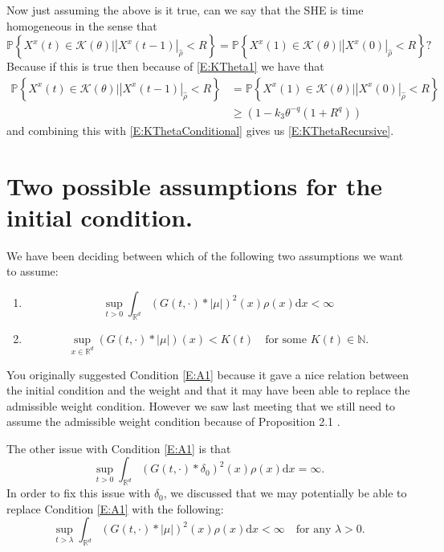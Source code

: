 \documentclass{article}
\numberwithin{equation}{section}
\newcommand{\R}{\mathbb{R}}
\newcommand{\ud}{\ensuremath{\mathrm{d}}}
\begin{document}
Now just assuming the above is it true, can we say that the SHE is time homogeneous in the sense that 
	\[
			\mathbb{P}\left\{ X^x(t) \in \mathscr{K}(\theta) \bigg\vert  \left| X^x(t-1) \right|_{\hat{\rho}} < R  \right\} = \mathbb{P}\left\{ X^x(1) \in \mathscr{K}(\theta) \bigg\vert  \left| X^x(0) \right|_{\hat{\rho}} < R  \right\}? 
	\]
Because if this is true then because of \eqref{E:KTheta1} we have that 
	\begin{align*}
			\mathbb{P}\left\{ X^x(t) \in \mathscr{K}(\theta) \bigg\vert  \left| X^x(t-1) \right|_{\hat{\rho}} < R  \right\} &= \mathbb{P}\left\{ X^x(1) \in \mathscr{K}(\theta) \bigg\vert  \left| X^x(0) \right|_{\hat{\rho}} < R  \right\}
			\\ & \ge (1-k_3\theta^{-q}(1+R^q))
	\end{align*}
and combining this with \eqref{E:KThetaConditional} gives us \eqref{E:KThetaRecursive}.

\section{Two possible assumptions for the initial condition.}
We have been deciding between which of the following two assumptions we want to assume:
	\begin{enumerate}
		\item 
			\begin{equation}\label{E:A1} 
				\sup_{t>0} \int_{\R^d} (G(t,\cdot) * |\mu|)^2(x)\rho(x) \ud x < \infty
			\end{equation}
		\item 
			\begin{equation} \label{E:A2} 
				\sup_{x \in \R^d} (G(t,\cdot) * |\mu|)(x) < K(t) \quad \text{for some } K(t) \in \mathbb{N}.
			\end{equation}
	\end{enumerate}

You originally suggested Condition \eqref{E:A1} because it gave a nice relation between the initial condition and the weight and that it may have been able to replace the admissible weight condition. However we saw last meeting that we still need to assume the admissible weight condition because of Proposition 2.1 \cite{TZ98}. 

The other issue with Condition \eqref{E:A1} is that 
	\[
		\sup_{t>0} \int_{\R^d} (G(t,\cdot) * \delta_0)^2(x)\rho(x) \ud x = \infty.
	\]
In order to fix this issue with $\delta_0$, we discussed that we may potentially be able to replace Condition \eqref{E:A1} with the following:
	\begin{equation}\label{E:A1.1}
		\sup_{t>\lambda} \int_{\R^d} (G(t,\cdot) * |\mu|)^2(x)\rho(x) \ud x < \infty \quad \text{for any } \lambda > 0.
	\end{equation}
\end{document}
